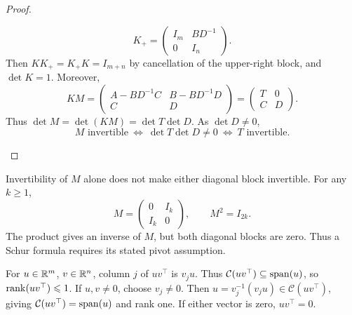 \begin{proof}
\begin{itemize}
\[  K_+=\begin{pmatrix}I_m&BD^{-1}\\0&I_n\end{pmatrix}.
  \]
  Then \(KK_+=K_+K=I_{m+n}\) by cancellation of the upper-right block,
  and \(\det K=1\). Moreover,
  \[
  KM=\begin{pmatrix}A-BD^{-1}C&B-BD^{-1}D\\C&D\end{pmatrix}
    =\begin{pmatrix}T&0\\C&D\end{pmatrix}.
  \]
  Thus \(\det M=\det(KM)=\det T\det D\). As \(\det D\ne0\),
  \[
  M\text{ invertible}\ \Longleftrightarrow\ \det T\det D\ne0
  \ \Longleftrightarrow\ T\text{ invertible}.
  \]
\end{itemize}
\end{proof}

Invertibility of \(M\) alone does not
make either diagonal block invertible. For any \(k\geqslant1\),
\[
M=\begin{pmatrix}0&I_k\\I_k&0\end{pmatrix},\qquad M^2=I_{2k}.
\]
The product gives an inverse of \(M\), but both diagonal blocks are zero.
Thus a Schur formula requires its stated pivot assumption.

For \(u\in\mathbb R^m\), \(v\in\mathbb R^n\), column
\(j\) of \(uv^\top\) is \(v_ju\). Thus
\(\mathcal C(uv^\top)\subseteq\operatorname{span}(u)\), so \(\operatorname{rank}(uv^\top)\leqslant1\).
If \(u,v\ne0\), choose \(v_j\ne0\). Then
\(u=v_j^{-1}(v_ju)\in\mathcal C(uv^\top)\), giving
\(\mathcal C(uv^\top)=\operatorname{span}(u)\) and rank one.
If either vector is zero, \(uv^\top=0\).

